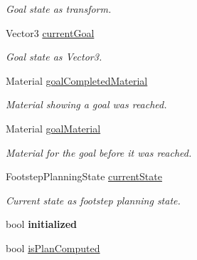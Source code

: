 \begin{DoxyCompactItemize}
\begin{DoxyCompactList}\small\item\em Goal state as transform. \end{DoxyCompactList}\item 
\hypertarget{class_planner_af95edfb9e8e93af5dccf7e6b18d7a9c6}{Vector3 \hyperlink{class_planner_af95edfb9e8e93af5dccf7e6b18d7a9c6}{current\-Goal}}\label{class_planner_af95edfb9e8e93af5dccf7e6b18d7a9c6}

\begin{DoxyCompactList}\small\item\em Goal state as Vector3. \end{DoxyCompactList}\item 
\hypertarget{class_planner_a752390ecc83a78028b2ec28efe5b9d34}{Material \hyperlink{class_planner_a752390ecc83a78028b2ec28efe5b9d34}{goal\-Completed\-Material}}\label{class_planner_a752390ecc83a78028b2ec28efe5b9d34}

\begin{DoxyCompactList}\small\item\em Material showing a goal was reached. \end{DoxyCompactList}\item 
\hypertarget{class_planner_aead3ef24c43c10820e48e51ae21d3280}{Material \hyperlink{class_planner_aead3ef24c43c10820e48e51ae21d3280}{goal\-Material}}\label{class_planner_aead3ef24c43c10820e48e51ae21d3280}

\begin{DoxyCompactList}\small\item\em Material for the goal before it was reached. \end{DoxyCompactList}\item 
\hypertarget{class_planner_aee6e18d65f96ef4b7bfdc7fc035c5d43}{Footstep\-Planning\-State \hyperlink{class_planner_aee6e18d65f96ef4b7bfdc7fc035c5d43}{current\-State}}\label{class_planner_aee6e18d65f96ef4b7bfdc7fc035c5d43}

\begin{DoxyCompactList}\small\item\em Current state as footstep planning state. \end{DoxyCompactList}\item 
\hypertarget{class_planner_ab9722eb37c59037b8ee255d129714b62}{bool {\bfseries initialized}}\label{class_planner_ab9722eb37c59037b8ee255d129714b62}

\item 
\hypertarget{class_planner_a73e7ae359b3f55578281abd81efecae1}{bool \hyperlink{class_planner_a73e7ae359b3f55578281abd81efecae1}{is\-Plan\-Computed}}\label{class_planner_a73e7ae359b3f55578281abd81efecae1}


\end{DoxyCompactItemize}
